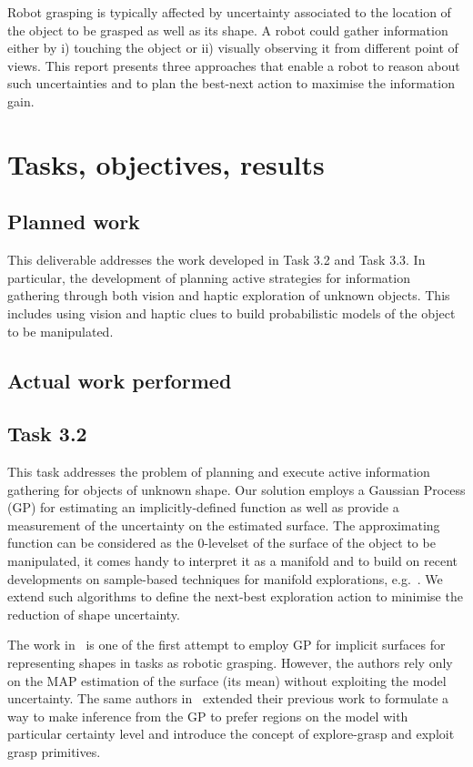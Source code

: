 \documentclass[a4paper,11pt,pdf]{pacmanreport}
\begin{document}
Robot grasping is typically affected by uncertainty associated to the location of the object to be grasped as well as its shape. 
A robot could gather information either by i) touching the object or ii) visually observing it from different point of views. 
This report presents three approaches that enable a robot to reason about such uncertainties and to plan the best-next action to maximise the information gain.

\newpage

\section{Tasks, objectives, results}

\subsection{Planned work}

This deliverable addresses the work developed in Task 3.2 and Task 3.3.
In particular, the development of planning active strategies for information gathering through both vision and 
haptic exploration of unknown objects. 
This includes using vision and haptic clues to build probabilistic models of the object to be manipulated.   

\subsection{Actual work performed}

\subsection{Task 3.2}

This task addresses the problem of planning and execute active information gathering for objects of unknown shape. Our solution employs a Gaussian Process (GP) for estimating an implicitly-defined function as well as provide a measurement of the uncertainty on the estimated surface. The approximating function can be considered as the 0-levelset of the surface of the object to be manipulated, it comes handy to interpret it as a manifold and to build on recent developments on sample-based techniques for manifold explorations, e.g.~\cite{Jaillet2013Path}. We extend such algorithms to define the next-best exploration action to minimise the reduction of shape uncertainty. 

The work in~\cite{Dragiev2011Gaussian} is one of the first attempt to employ GP for implicit surfaces for representing shapes in tasks as robotic grasping. However, the authors rely only on the MAP estimation of the surface (its mean) without exploiting the model uncertainty. The same authors in~\cite{Dragiev2013Uncertainty} extended their previous work to formulate a way to make inference from the GP to prefer regions on the model with particular certainty level and introduce the concept of explore-grasp and exploit grasp primitives. 
\end{document}
